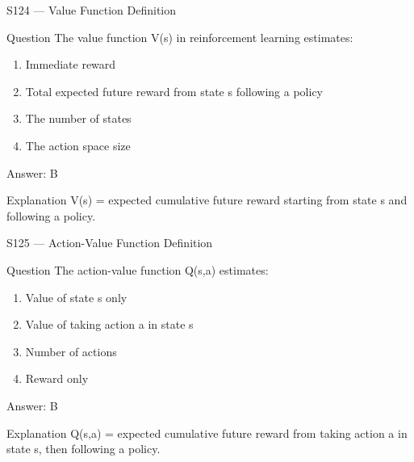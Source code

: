 \documentclass[aspectratio=169,8pt]{beamer}
\begin{document}
	\begin{frame}{S124 --- Value Function Definition}
		\begin{block}{Question}
			The value function V(s) in reinforcement learning estimates:
			\begin{enumerate}
				\item Immediate reward
				\item Total expected future reward from state s following a policy
				\item The number of states
				\item The action space size
			\end{enumerate}
		\end{block}
		\begin{exampleblock}{Answer: B}\end{exampleblock}
		\begin{block}{Explanation}
			V(s) = expected cumulative future reward starting from state s and following a policy.
		\end{block}
	\end{frame}
	
	\begin{frame}{S125 --- Action-Value Function Definition}
		\begin{block}{Question}
			The action-value function Q(s,a) estimates:
			\begin{enumerate}
				\item Value of state s only
				\item Value of taking action a in state s
				\item Number of actions
				\item Reward only
			\end{enumerate}
		\end{block}
		\begin{exampleblock}{Answer: B}\end{exampleblock}
		\begin{block}{Explanation}
			Q(s,a) = expected cumulative future reward from taking action a in state s, then following a policy.
		\end{block}
	\end{frame}
	
\end{document}

